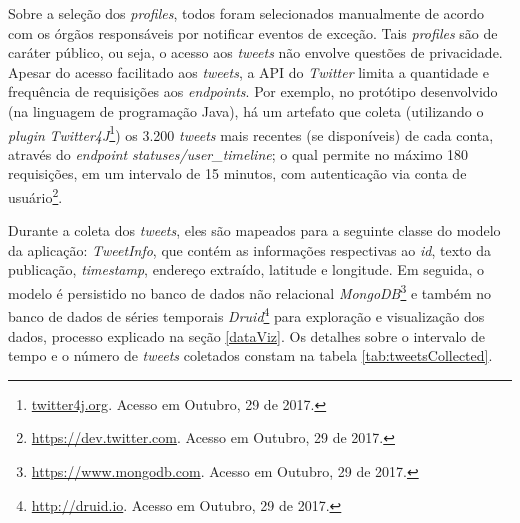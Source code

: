 \documentclass[
	12pt,				%
	oneside,			%
	a4paper,			%
	english,			%
	brazil				%
	]{abntex2ppgsi}
\begin{document}
Sobre a seleção dos \textit{profiles}, todos foram selecionados manualmente de acordo com os órgãos responsáveis por notificar eventos de exceção. Tais \textit{profiles} são de caráter público, ou seja, o acesso aos \textit{tweets} não envolve questões de privacidade.
Apesar do acesso facilitado aos \textit{tweets}, a API do \textit{Twitter} limita a quantidade e frequência de requisições aos \textit{endpoints}. Por exemplo, no protótipo desenvolvido (na linguagem de programação Java), há um artefato que coleta (utilizando o \textit{plugin} \textit{Twitter4J}\footnote{\url{twitter4j.org}. Acesso em Outubro, 29 de 2017.}) os 3.200 \textit{tweets} mais recentes (se disponíveis) de cada conta, através do \textit{endpoint} \textit{statuses/user\_timeline}; o qual permite no máximo 180 requisições, em um intervalo de 15 minutos, com autenticação via conta de usuário\footnote{\url{https://dev.twitter.com}. Acesso em Outubro, 29 de 2017.}.

Durante a coleta dos \textit{tweets}, eles são mapeados para a seguinte classe do modelo da aplicação: \textit{TweetInfo}, que contém as informações respectivas ao \textit{id}, texto da publicação, \textit{timestamp}, endereço extraído, latitude e longitude. Em seguida, o modelo é persistido no banco de dados não relacional \textit{MongoDB}\footnote{\url{https://www.mongodb.com}. Acesso em Outubro, 29 de 2017.} e também no banco de dados de séries temporais \textit{Druid}\footnote{\url{http://druid.io}. Acesso em Outubro, 29 de 2017.} para exploração e visualização dos dados, processo explicado na seção \ref{dataViz}. Os detalhes sobre o intervalo de tempo e o número de \textit{tweets} coletados constam na tabela \ref{tab:tweetsCollected}.
\end{document}
